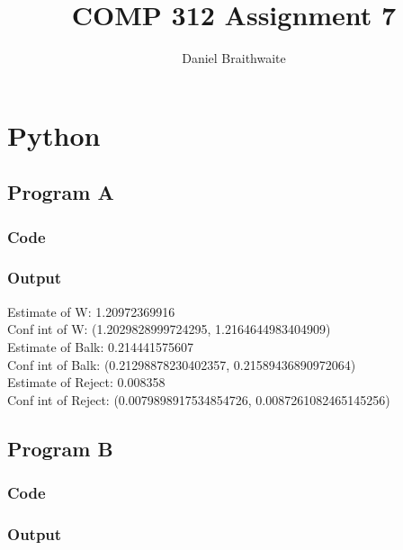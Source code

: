 \documentclass{article}
\title{COMP 312 Assignment 7}
\author{Daniel Braithwaite}
\begin{document}
	\maketitle
	\newpage
  	
  	\section{Python}
  		\subsection{Program A}
			\subsubsection{Code}
				
			\subsubsection{Output}
				Estimate of W: 1.20972369916\\
				Conf int of W: (1.2029828999724295, 1.2164644983404909)\\

Estimate of Balk: 0.214441575607\\
Conf int of Balk: (0.21298878230402357, 0.21589436890972064)\\

Estimate of Reject: 0.008358\\
Conf int of Reject: (0.0079898917534854726, 0.0087261082465145256)\\


  		
  		
  		\subsection{Program B}
  			\subsubsection{Code}
				
			\subsubsection{Output}
				
\end{document}
